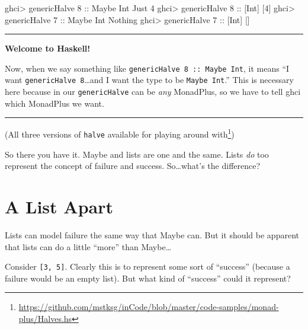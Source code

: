 \documentclass[]{article}
\newenvironment{Shaded}{}{}
\newcommand{\DataTypeTok}[1]{\textcolor[rgb]{0.56,0.13,0.00}{{#1}}}
\newcommand{\DecValTok}[1]{\textcolor[rgb]{0.25,0.63,0.44}{{#1}}}
\newcommand{\OtherTok}[1]{\textcolor[rgb]{0.00,0.44,0.13}{{#1}}}
\newcommand{\FunctionTok}[1]{\textcolor[rgb]{0.02,0.16,0.49}{{#1}}}
\newcommand{\NormalTok}[1]{{#1}}
\renewcommand{\href}[2]{#2\footnote{\url{#1}}}
\begin{document}
\begin{Shaded}
\begin{Highlighting}[]
\NormalTok{ghci}\FunctionTok{>} \NormalTok{genericHalve }\DecValTok{8}\OtherTok{ ::} \DataTypeTok{Maybe} \DataTypeTok{Int}
\DataTypeTok{Just} \DecValTok{4}
\NormalTok{ghci}\FunctionTok{>} \NormalTok{genericHalve }\DecValTok{8}\OtherTok{ ::} \NormalTok{[}\DataTypeTok{Int}\NormalTok{]}
\NormalTok{[}\DecValTok{4}\NormalTok{]}
\NormalTok{ghci}\FunctionTok{>} \NormalTok{genericHalve }\DecValTok{7}\OtherTok{ ::} \DataTypeTok{Maybe} \DataTypeTok{Int}
\DataTypeTok{Nothing}
\NormalTok{ghci}\FunctionTok{>} \NormalTok{genericHalve }\DecValTok{7}\OtherTok{ ::} \NormalTok{[}\DataTypeTok{Int}\NormalTok{]}
\NormalTok{[]}
\end{Highlighting}
\end{Shaded}

\begin{center}\rule{0.5\linewidth}{\linethickness}\end{center}

\textbf{Welcome to Haskell!}

Now, when we say something like
\texttt{genericHalve\ 8\ ::\ Maybe\ Int}, it means ``I want
\texttt{genericHalve\ 8}\ldots{}and I want the type to be
\texttt{Maybe\ Int}.'' This is necessary here because in our
\texttt{genericHalve} can be \emph{any} MonadPlus, so we have to tell
ghci which MonadPlus we want.

\begin{center}\rule{0.5\linewidth}{\linethickness}\end{center}

(\href{https://github.com/mstksg/inCode/blob/master/code-samples/monad-plus/Halves.hs}{All
three versions of \texttt{halve} available for playing around with})

So there you have it. Maybe and lists are one and the same. Lists
\emph{do} too represent the concept of failure and success.
So\ldots{}what's the difference?

\section{A List Apart}\label{a-list-apart}

Lists can model failure the same way that Maybe can. But it should be
apparent that lists can do a little ``more'' than Maybe\ldots{}

Consider \texttt{{[}3,\ 5{]}}. Clearly this is to represent some sort of
``success'' (because a failure would be an empty list). But what kind of
``success'' could it represent?
\end{document}
